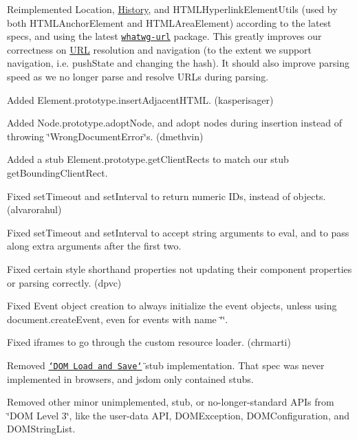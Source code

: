 \begin{DoxyItemize}
\item Reimplemented {\ttfamily Location}, {\ttfamily \mbox{\hyperlink{interface_history}{History}}}, and {\ttfamily H\+T\+M\+L\+Hyperlink\+Element\+Utils} (used by both {\ttfamily H\+T\+M\+L\+Anchor\+Element} and {\ttfamily H\+T\+M\+L\+Area\+Element}) according to the latest specs, and using the latest \href{https://github.com/jsdom/whatwg-url}{\tt whatwg-\/url} package. This greatly improves our correctness on \mbox{\hyperlink{namespace_u_r_l}{U\+RL}} resolution and navigation (to the extent we support navigation, i.\+e. {\ttfamily push\+State} and changing the hash). It should also improve parsing speed as we no longer parse and resolve U\+R\+Ls during parsing.
\item Added {\ttfamily Element.\+prototype.\+insert\+Adjacent\+H\+T\+ML}. (kasperisager)
\item Added {\ttfamily Node.\+prototype.\+adopt\+Node}, and adopt nodes during insertion instead of throwing {\ttfamily \char`\"{}\+Wrong\+Document\+Error\char`\"{}}s. (dmethvin)
\item Added a stub {\ttfamily Element.\+prototype.\+get\+Client\+Rects} to match our stub {\ttfamily get\+Bounding\+Client\+Rect}.
\item Fixed {\ttfamily set\+Timeout} and {\ttfamily set\+Interval} to return numeric I\+Ds, instead of objects. (alvarorahul)
\item Fixed {\ttfamily set\+Timeout} and {\ttfamily set\+Interval} to accept string arguments to eval, and to pass along extra arguments after the first two.
\item Fixed certain style shorthand properties not updating their component properties or parsing correctly. (dpvc)
\item Fixed {\ttfamily Event} object creation to always initialize the event objects, unless using {\ttfamily document.\+create\+Event}, even for events with name {\ttfamily \char`\"{}\char`\"{}}.
\item Fixed iframes to go through the custom resource loader. (chrmarti)
\item Removed \href{http://www.w3.org/TR/2003/CR-DOM-Level-3-LS-20031107/load-save.html}{\tt \char`\"{}\+D\+O\+M Load and Save\char`\"{}} stub implementation. That spec was never implemented in browsers, and jsdom only contained stubs.
\item Removed other minor unimplemented, stub, or no-\/longer-\/standard A\+P\+Is from \char`\"{}\+D\+O\+M Level 3\char`\"{}, like the user-\/data A\+PI, {\ttfamily D\+O\+M\+Exception}, {\ttfamily D\+O\+M\+Configuration}, and {\ttfamily D\+O\+M\+String\+List}.
\end{DoxyItemize}

